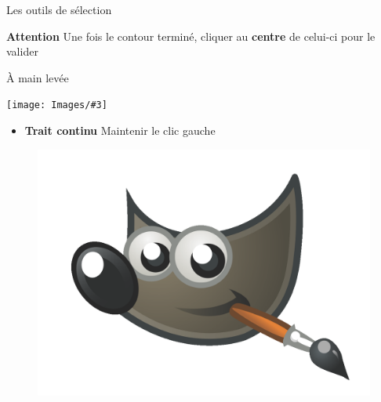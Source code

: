 \documentclass[10pt,svgnames,usenames,table]{beamer}
\newcommand{\tool}[3]{%
	\begin{minipage}{0.40\textwidth}
	\item #1
	\end{minipage}\hfill
	\begin{minipage}{0.20\textwidth}
	\begin{flushright}
	\keys{#2}
	\end{flushright}
	\end{minipage}
	\begin{minipage}{0.06\textwidth}
	\fbox{ou}
	\end{minipage}
	\begin{minipage}{0.1\textwidth}
	\texttt{[image: Images/\#3]}
	\end{minipage}
}
\begin{document}
\begin{frame}[allowframebreaks]{Les outils de sélection}
\begin{enumerate}
	\vspace{0.4cm}
	\textbf{Attention} Une fois le contour terminé, cliquer au \textbf{centre} de celui-ci pour le valider

	\framebreak

	\tool{À main levée}{F}{freeSelect.png}

	\begin{itemize}
		\item \textbf{Trait continu} Maintenir le clic gauche 
	\end{itemize}

		\begin{minipage}{0.45\textwidth}
		\begin{figure}
	    		\centering
	    		\includegraphics[width=\textwidth]{Images/gimp-logo.png} 
		\end{figure}
		\end{minipage}\hfill
		\begin{minipage}{0.45\textwidth}
		\begin{figure}
	    		\centering

\end{figure}
\end{minipage}
\end{enumerate}
\end{frame}
\end{document}
